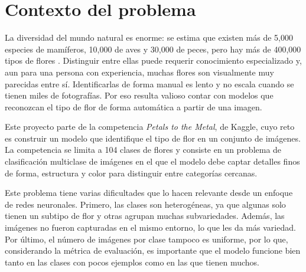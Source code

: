 \section{Contexto del problema}
La diversidad del mundo natural es enorme: se estima que existen más de 5,000 especies de mamíferos, 10,000 de aves y 30,000 de peces, pero hay más de 400,000 tipos de flores \parencite{kagglePetalsMetal}. Distinguir entre ellas puede requerir conocimiento especializado y, aun para una persona con experiencia, muchas flores son visualmente muy parecidas entre sí. Identificarlas de forma manual es lento y no escala cuando se tienen miles de fotografías. Por eso resulta valioso contar con modelos que reconozcan el tipo de flor de forma automática a partir de una imagen.

Este proyecto parte de la competencia \textit{Petals to the Metal}, de Kaggle, cuyo reto es construir un modelo que identifique el tipo de flor en un conjunto de imágenes. La competencia se limita a 104 clases de flores y consiste en un problema de clasificación multiclase de imágenes en el que el modelo debe captar detalles finos de forma, estructura y color para distinguir entre categorías cercanas.

Este problema tiene varias dificultades que lo hacen relevante desde un enfoque de redes neuronales. Primero, las clases son heterogéneas, ya que algunas solo tienen un subtipo de flor y otras agrupan muchas subvariedades. Además, las imágenes no fueron capturadas en el mismo entorno, lo que les da más variedad. Por último, el número de imágenes por clase tampoco es uniforme, por lo que, considerando la métrica de evaluación, es importante que el modelo funcione bien tanto en las clases con pocos ejemplos como en las que tienen muchos.
